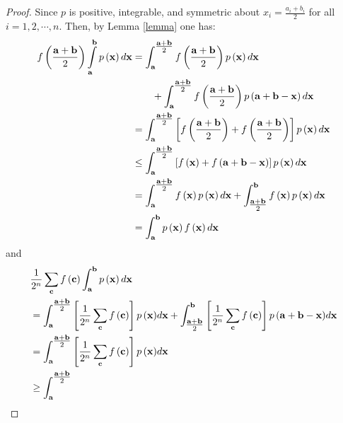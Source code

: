 \documentclass{amsart}
\theoremstyle{plain}
\numberwithin{equation}{section}
\begin{document}
\begin{proof}
Since $p$ is positive, integrable, and symmetric about $x_i =
\frac{{a_i + b_i}}{2}$ for all $i=1,2,\cdots, n$. Then, by Lemma
\ref{lemma} one has:
\begin{align*}
 f\left( {\frac{{{\bf{a}} + {\bf{b}}}}{2}}
\right)\int\limits_{\bf{a}}^{\bf{b}}
{p\left({{\bf{x}}}\right)d{\bf{x}}} &=
\int_{\bf{a}}^{{\textstyle{{{\bf{a}} + {\bf{b}}} \over 2}}}
{f\left( {\frac{{{\bf{a}} + {\bf{b}}}}{2}} \right)p\left( {\bf{x}}
\right)d{\bf{x}}}
\\
&\qquad+ \int_{\bf{a}}^{{\textstyle{{{\bf{a}} + {\bf{b}}} \over
2}}} {f\left( {\frac{{{\bf{a}} + {\bf{b}}}}{2}} \right)p\left(
{{\bf{a}} + {\bf{b}} - {\bf{x}}} \right)d{\bf{x}}}
\\
&=\int_{\bf{a}}^{{\textstyle{{{\bf{a}} + {\bf{b}}} \over 2}}}
{\left[ {f\left( {\frac{{{\bf{a}} + {\bf{b}}}}{2}} \right) +
f\left( {\frac{{{\bf{a}} + {\bf{b}}}}{2}} \right)} \right]p\left(
{\bf{x}} \right)d{\bf{x}}}
\\
&\le \int_{\bf{a}}^{{\textstyle{{{\bf{a}} + {\bf{b}}} \over 2}}}
{\left[ {f\left( {{\bf{x}}} \right) + f\left( {{\bf{a}} + {\bf{b}}
- {\bf{x}}} \right)} \right]p\left( {\bf{x}} \right)d{\bf{x}}}
\\
&=  \int_{\bf{a}}^{{\textstyle{{{\bf{a}} + {\bf{b}}} \over 2}}}
{f\left( {{\bf{x}}} \right)p\left( {\bf{x}} \right)d{\bf{x}}}  +
\int_{{\textstyle{{{\bf{a}} + {\bf{b}}} \over 2}}}^{\bf{b}}
{f\left( {{\bf{x}}} \right)p\left( {\bf{x}} \right)d{\bf{x}}}
\\
&=\int_{\bf{a}}^{\bf{b}} {p\left( {\bf{x}} \right)f\left( {\bf{x}}
\right)d{\bf{x}}}
\end{align*}
and
\begin{align*}
& \frac{1}{{2^n }}\sum\limits_{\bf{c}} {f\left( {\bf{c}} \right)}
\int_{\bf{a}}^{\bf{b}} {p\left( {\bf{x}} \right)d{\bf{x}}}
\\
&=  \int_{\bf{a}}^{{\textstyle{{{\bf{a}} + {\bf{b}}} \over 2}}}
{{\left[ {\frac{1}{{2^n }}\sum\limits_{\bf{c}} {f\left( {\bf{c}}
\right)}} \right]p\left( {\bf{x}}
\right)}d{\bf{x}}}+\int_{{{\textstyle{{{\bf{a}} + {\bf{b}}} \over
2}}}}^{\bf{b}} {{\left[ {\frac{1}{{2^n }}\sum\limits_{\bf{c}}
{f\left( {\bf{c}} \right)}} \right]p\left(
{\bf{{\bf{a}}+{\bf{b}}-{\bf{x}}}} \right)}d{\bf{x}}}
\\
&=  \int_{\bf{a}}^{{\textstyle{{{\bf{a}} + {\bf{b}}} \over 2}}}
{{\left[ {\frac{1}{{2^n }}\sum\limits_{\bf{c}} {f\left( {\bf{c}}
\right)}} \right]p\left( {\bf{x}} \right)}d{\bf{x}}}
\\
&\ge\int_{\bf{a}}^{{\textstyle{{{\bf{a}} + {\bf{b}}} \over 2}}}

\end{align*}
\end{proof}
\end{document}
